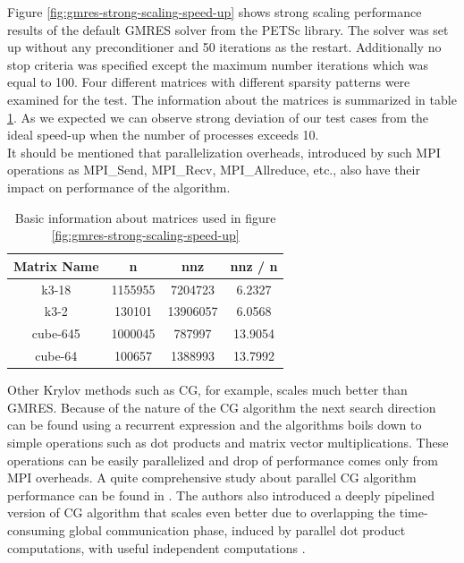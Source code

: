 Figure \ref{fig:gmres-strong-scaling-speed-up} shows strong scaling performance results of the default GMRES solver from the PETSc library. The solver was set up without any preconditioner and 50 iterations as the restart. Additionally no stop criteria was specified except the maximum number iterations which was equal to 100. Four different matrices with different sparsity patterns were examined for the test. The information about the matrices is summarized in table \ref{table:matrix-info-1}. As we expected we can observe strong deviation of our test cases from the ideal speed-up when the number of processes exceeds 10.\\

It should be mentioned that parallelization overheads, introduced by such MPI operations as MPI\_Send, MPI\_Recv, MPI\_Allreduce, etc., also have their impact on performance of the algorithm.\\

\begin{table}[htpb]
\centering
\begin{tabular}{|c|c|c|c|}
\hline
Matrix Name & n       & nnz      & nnz / n \\ \hline
k3-18       & 1155955 & 7204723  & 6.2327  \\ \hline
k3-2        & 130101  & 13906057 & 6.0568  \\ \hline
cube-645    & 1000045 & 787997   & 13.9054 \\ \hline
cube-64     & 100657  & 1388993  & 13.7992 \\ \hline
\end{tabular}
\caption{Basic information about matrices used in figure \ref{fig:gmres-strong-scaling-speed-up}}
\label{table:matrix-info-1}
\end{table}

Other Krylov methods such as CG, for example, scales much better than GMRES. Because of the nature of the CG algorithm the next search direction can be found using a recurrent expression and the algorithms boils down to simple operations such as dot products and matrix vector multiplications. These operations can be easily parallelized and drop of performance comes only from MPI overheads. A quite comprehensive study about parallel CG algorithm performance can be found in \cite{sparse-la:cg}. The authors also introduced a deeply pipelined version of CG algorithm that scales even better due to overlapping the time-consuming global communication phase, induced by parallel dot product computations, with useful independent computations \cite{sparse-la:cg}.\\

